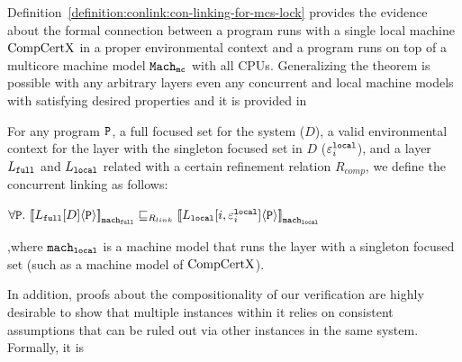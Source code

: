Definition~\ref{definition:conlink:con-linking-for-mcs-lock} provides the evidence about the formal connection between a program runs with a single local machine $\mathrm{CompCertX}$ in a proper environmental context and a program runs on top of a multicore machine model ${{{{\mathrm{\texttt{Mach}}}}_{\mathrm{\texttt{mc}}}}}$ with all CPUs.
%
%
Generalizing the theorem is possible with any arbitrary layers even  any concurrent and local machine models with satisfying desired properties
and it is provided in 
\begin{definition}
\label{definition:conlink:concurrent-linking}
For any program $ {\mathrm{\texttt{P}}}$, a full focused set for the system ($D$), a valid environmental context for the layer with the singleton focused set in $D$ (${\varepsilon}^{{\mathrm{\texttt{local}}}}_{i}$), and a layer $L_{{\mathrm{\texttt{full}}}}$ and $L_{{\mathrm{\texttt{local}}}}$ related with a certain 
refinement relation $R_{comp}$, we define the concurrent linking as follows:
\begin{center}
$\forall \codeinmath{P}. \ \semwmachine{L_{\codeinmath{full}}[D]}{\codeinmath{P}}{\codeinmath{mach}_{\codeinmath{full}}} \refines_{R_{link}} \semwmachine{\PLayer{L_{\codeinmath{local}}}{i}{\oracle^{\codeinmath{local}}_{i}}}{\codeinmath{P}}{\codeinmath{mach}_{\codeinmath{local}}}$
\end{center}
,where ${\mathrm{\texttt{mach}}}_{{\mathrm{\texttt{local}}}}$ is a machine model that runs the layer with a singleton focused set (such as a machine model of $\mathrm{CompCertX}$).
\end{definition}
{\noindent}
In addition, proofs about the compositionality of our verification are highly desirable to show that multiple instances within it relies on  consistent assumptions that can be ruled out via other instances in the same system.  Formally, it is
